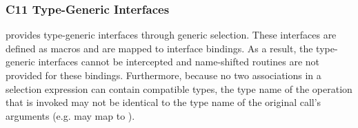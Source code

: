 \subsubsection{C11 Type-Generic Interfaces}
\label{sec:pshmem_c11_type_generic_interfaces}
\openshmem provides type-generic interfaces through \Cstd[11]
generic selection. These interfaces are defined as macros
and are mapped to \Cstd interface bindings. As a result, the
\Cstd[11] type-generic interfaces cannot be intercepted and
name-shifted  routines are not provided for these
bindings. Furthermore, because no two associations in a \Cstd[11]
 selection expression can contain compatible types,
the type name of the \Cstd operation that is invoked may not be
identical to the type name of the original call's arguments (e.g.
 may map to ).

